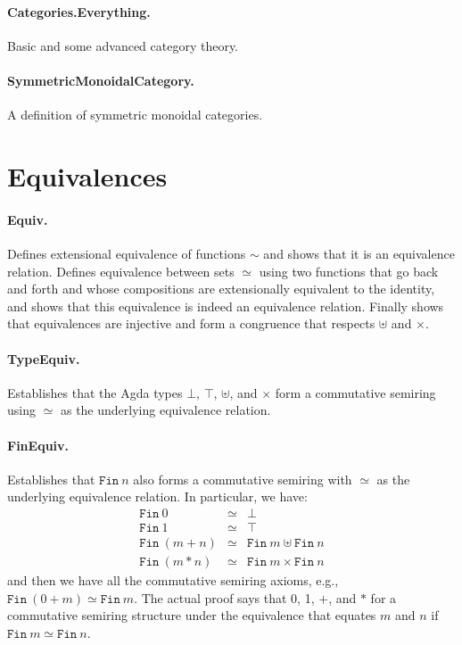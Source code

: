 \documentclass{article}
\begin{document}
\paragraph*{Categories.Everything.} Basic and some advanced category theory.

\paragraph*{SymmetricMonoidalCategory.} A definition of symmetric
monoidal categories.

\section{Equivalences} 

\paragraph*{Equiv.} Defines extensional equivalence of functions
$\sim$ and shows that it is an equivalence relation. Defines
equivalence between sets $\simeq$ using two functions that go back and
forth and whose compositions are extensionally equivalent to the
identity, and shows that this equivalence is indeed an equivalence
relation. Finally shows that equivalences are injective and form a
congruence that respects $\uplus$ and $\times$. 

\paragraph*{TypeEquiv.} Establishes that the Agda types $\bot$,
$\top$, $\uplus$, and $\times$ form a commutative semiring using
$\simeq$ as the underlying equivalence relation.

\paragraph*{FinEquiv.} Establishes that $\texttt{Fin}~n$ also forms a
commutative semiring with $\simeq$ as the underlying equivalence
relation. In particular, we have:
\[\begin{array}{rcll}
\texttt{Fin}~0 &\simeq& \bot \\
\texttt{Fin}~1 &\simeq& \top \\
\texttt{Fin}~(m+n) &\simeq& \texttt{Fin}~m \uplus \texttt{Fin}~n \\
\texttt{Fin}~(m*n) &\simeq& \texttt{Fin}~m \times \texttt{Fin}~n
\end{array}\]
and then we have all the commutative semiring axioms, e.g.,
$\texttt{Fin}~(0+m) \simeq \texttt{Fin}~m$. The actual proof says that
0, 1, $+$, and $*$ for a commutative semiring structure under the
equivalence that equates $m$ and $n$ if
$\texttt{Fin}~m \simeq \texttt{Fin}~n$.
\end{document}
